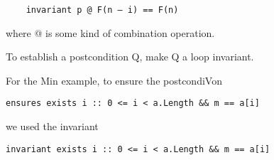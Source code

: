 \begin{verbatim}
    invariant p @ F(n – i) == F(n)
\end{verbatim}
where @ is some kind of combination operation.

To establish a postcondition Q, make Q a loop
invariant.

For the Min example, to ensure the postcondiVon
\begin{verbatim}
ensures exists i :: 0 <= i < a.Length && m == a[i]
\end{verbatim}
we used the invariant
\begin{verbatim}
invariant exists i :: 0 <= i < a.Length && m == a[i]
\end{verbatim}